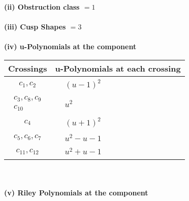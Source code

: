 \documentclass[1p]{elsarticle_modified}
\theoremstyle{definition}
\begin{document}
\flushleft \textbf{(ii) Obstruction class $= 1$}\\~\\
\flushleft \textbf{(iii) Cusp Shapes $= 3$}\\~\\
\newpage\renewcommand{\arraystretch}{1}
\flushleft \textbf{(iv) u-Polynomials at the component}\newline \\
\begin{tabular}{m{50pt}|m{274pt}}
Crossings & \hspace{64pt}u-Polynomials at each crossing \\
\hline $$\begin{aligned}c_{1},c_{2}\end{aligned}$$&$\begin{aligned}
&(u-1)^2
\end{aligned}$\\
\hline $$\begin{aligned}c_{3},c_{8},c_{9}\\c_{10}\end{aligned}$$&$\begin{aligned}
&u^2
\end{aligned}$\\
\hline $$\begin{aligned}c_{4}\end{aligned}$$&$\begin{aligned}
&(u+1)^2
\end{aligned}$\\
\hline $$\begin{aligned}c_{5},c_{6},c_{7}\end{aligned}$$&$\begin{aligned}
&u^2- u-1
\end{aligned}$\\
\hline $$\begin{aligned}c_{11},c_{12}\end{aligned}$$&$\begin{aligned}
&u^2+u-1
\end{aligned}$\\
\hline
\end{tabular}\\~\\
\newpage\renewcommand{\arraystretch}{1}
\flushleft \textbf{(v) Riley Polynomials at the component}\newline \\
\end{document}
